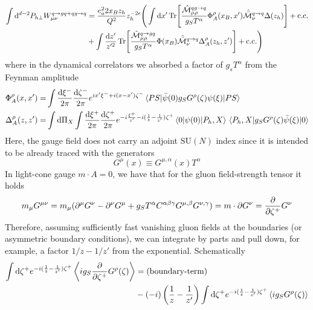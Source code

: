 \begin{equation}
    \begin{aligned}
    \int\dd^{d-2}P_{h\perp} W_{\mu\nu}^{q \to gq+qg\to q} &= \frac{e_a^22x_B z_h}{Q^2} z_h^{-2\epsilon}\Bigg(\int \dd x'\Tr[\frac{\hat{\mathcal{M}}_{\mu\rho}^{q g \to q}}{g_S T^\alpha} \Phi_A^\rho(x_B,x')\hat{\bar{\mathcal{M}}}_\nu^{q\to q}\Delta(z_h)] + \text{c.c.}\\
        &+\int \frac{\dd z'}{z'^2}\Tr[\frac{\hat{\mathcal{M}}^{q  \to g q}_{\mu\rho}}{g_S T^\alpha}\Phi(x_B)\hat{\bar{\mathcal{M}}}_\nu^{q\to q}\Delta_A^\rho(z_h,z')] + \text{c.c.}\Bigg)
    \end{aligned}
\end{equation}
where in the dynamical correlators we absorbed a factor of $g_sT^\alpha$ from the Feynman amplitude
\begin{equation}\label{eq:dynamical correlators}
    \begin{aligned}
        \Phi_A^\rho(x,x')=&\int\frac{\dd \xi^-}{2\pi}\frac{\dd \zeta^-}{2\pi}e^{ix'\xi^- + i(x-x')\zeta^-}\mel{PS}{\bar \psi(0)g_S G^\rho(\zeta)\psi(\xi)}{PS}\\
        \Delta_A^\rho(z,z')=&\int \dd \Pi_X\int\frac{\dd \xi^+}{2\pi}\frac{\dd \zeta^+}{2\pi}e^{-i\frac{\xi^+}{z'} - i(\frac{1}{z}-\frac{1}{z'})\zeta^+}\mel{0}{\psi(0)}{P_h,X}\mel{P_h,X}{g_S G^{\rho}(\zeta)\bar \psi(\xi)}{0}
    \end{aligned}
\end{equation}
Here, the gauge field does not carry an adjoint $\mathrm{SU}(N)$ index since it is intended to be already traced with the generators
\begin{equation}
    G^\mu (x)\equiv G^{\mu,\alpha}(x)T^\alpha
\end{equation}
In light-cone gauge $m\cdot A=0$, we have that for the gluon field-strength tensor it holds
\begin{equation}
    m_\mu G^{\mu\nu}=m_\mu(\partial^\mu G^\nu - \partial^\nu G^\mu+g_S T^{\alpha}C^{\alpha\beta\gamma }G^{\mu,\beta}G^{\nu,\gamma})=m \cdot \partial G^\nu=\pdv{\zeta^+} G^\nu
\end{equation}
Therefore, assuming sufficiently fast vanishing gluon fields at the boundaries (or asymmetric boundary conditions), we can integrate by parts and pull down, for example, a factor $1/z-1/z'$ from the exponential. Schematically 
\begin{equation}
\begin{aligned}
        \int \dd\zeta^+e^{-i(\frac{1}{z}-\frac{1}{z'})\zeta^+}\expval{ig_S\pdv{\zeta^+} G^\rho(\zeta)}&=\text{(boundary-term)}\\&-(-i)\left(\frac{1}{z}-\frac{1}{z'}\right)  \int \dd\zeta^+e^{-i(\frac{1}{z}-\frac{1}{z'})\zeta^+}\expval{ig_S G^\rho(\zeta)}
\end{aligned}
\end{equation}
